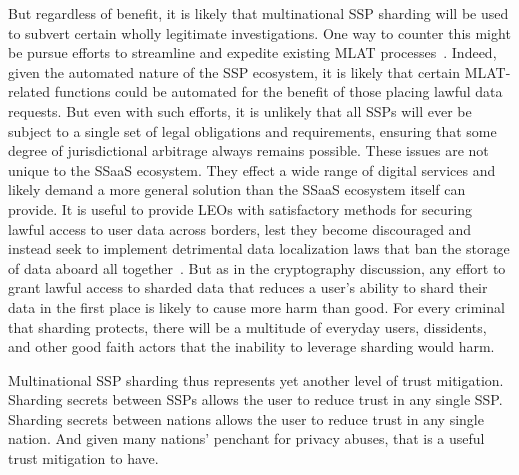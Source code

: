 But regardless of benefit, it is likely that multinational SSP
sharding will be used to subvert certain wholly legitimate
investigations. One way to counter this might be pursue efforts to
streamline and expedite existing MLAT
processes~\cite{nojeim2015}. Indeed, given the automated nature of the
SSP ecosystem, it is likely that certain MLAT-related functions could
be automated for the benefit of those placing lawful data
requests. But even with such efforts, it is unlikely that all SSPs
will ever be subject to a single set of legal obligations and
requirements, ensuring that some degree of jurisdictional arbitrage
always remains possible. These issues are not unique to the SSaaS
ecosystem. They effect a wide range of digital services and likely
demand a more general solution than the SSaaS ecosystem itself can
provide. It is useful to provide LEOs with satisfactory methods for
securing lawful access to user data across borders, lest they become
discouraged and instead seek to implement detrimental data
localization laws that ban the storage of data aboard all
together~\cite{whitehouse2013}. But as in the cryptography discussion,
any effort to grant lawful access to sharded data that reduces a
user's ability to shard their data in the first place is likely to
cause more harm than good. For every criminal that sharding protects,
there will be a multitude of everyday users, dissidents, and other
good faith actors that the inability to leverage sharding would harm.

Multinational SSP sharding thus represents yet another level of trust
mitigation. Sharding secrets between SSPs allows the user to reduce
trust in any single SSP. Sharding secrets between nations allows the
user to reduce trust in any single nation. And given many nations'
penchant for privacy abuses, that is a useful trust mitigation to
have.

